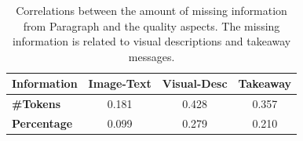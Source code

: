 

\begin{table}[t]
    \centering
    \small
    
    \begin{tabular}{@{}lccc@{}}
        \toprule
        \textbf{Information} & \textbf{Image-Text} & \textbf{Visual-Desc} & \textbf{Takeaway}  \\ \midrule
        \textbf{\#Tokens} & 0.181 & 0.428 & 0.357 \\
        \textbf{Percentage} & 0.099 & 0.279 & 0.210 \\ \bottomrule
    \end{tabular}

    \caption{Correlations between the amount of missing information from Paragraph and the quality aspects. The missing information is related to visual descriptions and takeaway messages.}
     \vspace{-2mm}    
    \label{tab:missing-alignment}
    
\end{table}




